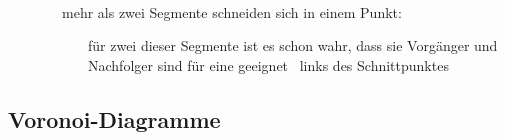 \topbreak
\up\up\up
\begin{description}
	\item[] \ \\\up
		\begin{description}
			\item[~~mehr als zwei Segmente schneiden sich in einem Punkt:] für zwei dieser Segmente ist es schon wahr, dass sie Vorgänger und Nachfolger sind für eine geeignet \sweep~links des Schnittpunktes
		\end{description}
\end{description}
\subsection{Voronoi-Diagramme}